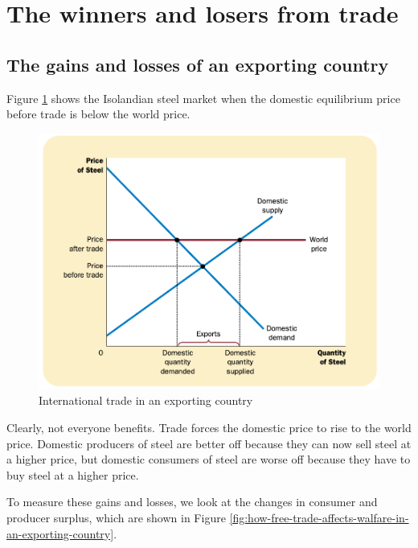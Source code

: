 \section{The winners and losers from trade}

\subsection{The gains and losses of an exporting country}

Figure \ref{fig:international-trade-in-an-exporting-country} shows the Isolandian steel market when the domestic equilibrium price before trade is below the world price.

\begin{figure}[!ht]
  \centering
  \includegraphics[width=\textwidth]{pics/international-trade-in-an-exporting-country}
  \caption{International trade in an exporting country}
  \label{fig:international-trade-in-an-exporting-country}
\end{figure}


Clearly, not everyone benefits. Trade forces the domestic price to rise to the world price. Domestic producers of steel are better off because they can now sell steel at a higher price, but domestic consumers of steel are worse off because they have to buy steel at a higher price.


To measure these gains and losses, we look at the changes in consumer and producer surplus, which are shown in Figure \ref{fig:how-free-trade-affects-walfare-in-an-exporting-country}.


